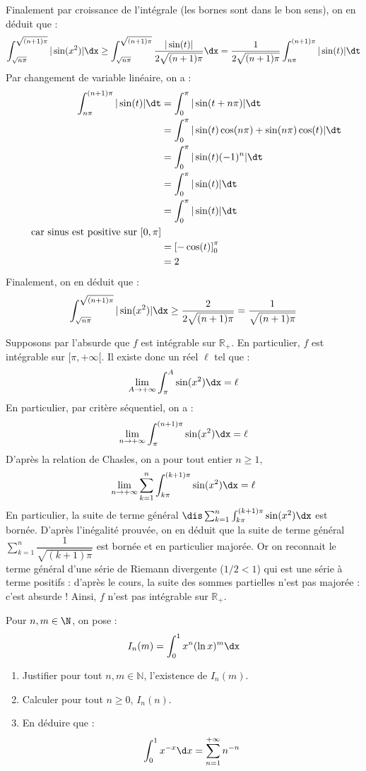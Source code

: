 \documentclass[a4paper,10pt]{report}
\begin{document}
\begin{enumerate}
Finalement par croissance de l'intégrale (les bornes sont dans le bon sens), on en déduit que :
$$ \int_{\sqrt{n \pi}}^{\sqrt{(n+1)\pi}} \vert \sin(x^2) \vert \dx \geq \int_{\sqrt{n \pi}}^{\sqrt{(n+1)\pi}} \dfrac{\vert \sin(t) \vert}{2 \sqrt{(n+1)\pi}} \dx = \dfrac{1}{2 \sqrt{(n+1)\pi}} \int_{n\pi}^{(n+1) \pi} \vert \sin(t) \vert \dt$$
Par changement de variable linéaire, on a : 
\begin{align*}
 \int_{n\pi}^{(n+1) \pi} \vert \sin(t) \vert \dt & =  \int_{0}^{\pi} \vert \sin(t+n \pi) \vert \dt\\
 & = \int_{0}^{\pi} \vert \sin(t) \cos(n \pi)+ \sin(n\pi)\cos(t) \vert \dt \\
 & =  \int_{0}^{\pi} \vert \sin(t) (-1)^n  \vert \dt \\
 & = \int_{0}^{\pi} \vert \sin(t)  \vert \dt \\
 & = \int_{0}^{\pi} \vert \sin(t)  \vert \dt \\ \; \hbox{ car sinus est positive sur } [0,\pi] \\
 & = \left[- \cos(t) \right]_0^{\pi} \\
 & = 2
\end{align*}
Finalement, on en déduit que :
$$ \int_{\sqrt{n \pi}}^{\sqrt{(n+1)\pi}} \vert \sin(x^2) \vert \dx \geq \dfrac{2}{2 \sqrt{(n+1)\pi}} = \dfrac{1}{\sqrt{(n+1)\pi}}$$
 \end{enumerate}
Supposons par l'absurde que $f$ est intégrable sur $\mathbb{R}_+$. En particulier, $f$ est intégrable sur $[\pi, + \infty[$. Il existe donc un réel $\ell$ tel que :
 $$ \lim_{A \rightarrow + \infty} \int_{\pi}^A \sin(x^2) \dx = \ell$$
 En particulier, par critère séquentiel, on a :
 $$ \lim_{n \rightarrow + \infty} \int_{\pi}^{(n+1)\pi} \sin(x^2) \dx = \ell$$
 D'après la relation de Chasles, on a pour tout entier $n \geq 1$,
 $$ \lim_{n \rightarrow + \infty} \sum_{k=1}^n \int_{k\pi}^{(k+1)\pi} \sin(x^2) \dx = \ell$$
 En particulier, la suite de terme général $\dis \sum_{k=1}^n \int_{k\pi}^{(k+1)\pi} \sin(x^2) \dx$ est bornée. D'après l'inégalité prouvée, on en déduit que la suite de terme général $\sum_{k=1}^n \dfrac{1}{\sqrt{(k+1)\pi}}$ est bornée et en particulier majorée. Or on reconnait le terme général d'une série de Riemann divergente ($1/2<1$) qui est une série à terme positifs : d'après le cours, la suite des sommes partielles n'est pas majorée : c'est absurde ! Ainsi, $f$ n'est pas intégrable sur $\mathbb{R}_+$.
 
 
\begin{Exa} Pour $n,m \in \N$, on pose :
  \[
  I_{n}(m) = \int_{0}^{1} x^{n}(\ln x)^{m} \dx
  \]
  \begin{enumerate}
  \item Justifier pour tout $n,m \in \mathbb{N}$, l'existence de $I_n(m)$.
  \item Calculer pour tout $n \geq 0$, $I_{n}(n)$.
  \item
    En déduire que :
    \[
    \int_{0}^{1} x^{ - x} \d x = \sum_{n = 1}^{ + \infty} n^{ - n}
    \]
  \end{enumerate}
\end{Exa}
\end{document}

